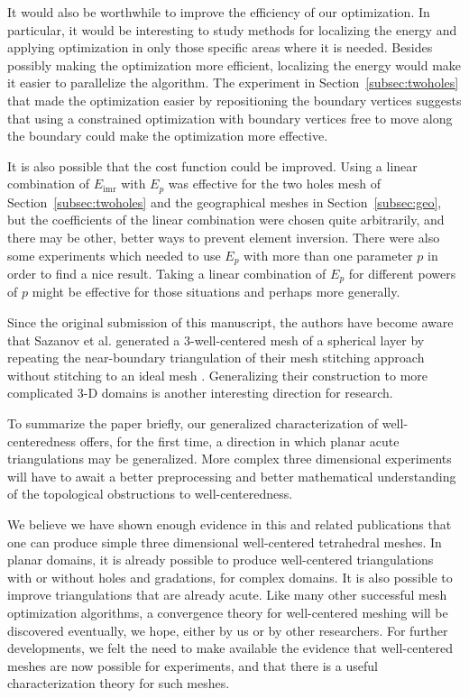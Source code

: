 \documentclass[final]{siamltex}
\begin{document}
It would also be worthwhile to improve the efficiency of
our optimization.  In particular, it would be interesting
to study methods for localizing the energy and applying
optimization in only those specific areas where
it is needed. Besides possibly making the optimization
more efficient, localizing the energy would make it
easier to parallelize the algorithm.  The experiment
in Section~\ref{subsec:twoholes} that made the optimization easier
by repositioning the boundary vertices suggests that
using a constrained optimization with boundary
vertices free to move along the boundary could make the
optimization more effective.

It is also possible that the cost function could be improved.  Using a
linear combination of $E_{\text{imr}}$ with $E_{p}$ was effective for
the two holes mesh of Section~\ref{subsec:twoholes} and
the geographical meshes in Section~\ref{subsec:geo},
but the coefficients of the linear combination
were chosen quite arbitrarily, and there may be other, better ways to
prevent element inversion.  There were also some experiments which
needed to use $E_{p}$ with more than one parameter $p$ in order to
find a nice result.  Taking a linear combination of $E_{p}$ for
different powers of $p$ might be effective for those situations and
perhaps more generally.


Since the original submission of this
manuscript, the authors have become aware
that Sazanov et al. generated a $3$-well-centered mesh
of a spherical layer by repeating the near-boundary triangulation
of their mesh stitching approach without stitching to an ideal
mesh \cite{SaHaMoWe2007}.  Generalizing their construction
to more complicated 3-D domains is another interesting direction
for research.

To summarize the paper briefly,
our generalized characterization of well-cen\-tered\-ness
offers, for the first time, a direction in which planar acute
triangulations may be generalized. More complex three dimensional
experiments will have to await a better preprocessing and better
mathematical understanding of the topological obstructions to
well-centeredness.

We believe we have shown enough evidence in this and related
publications that one can produce simple three dimensional
well-centered tetrahedral meshes. In planar domains, it is already
possible to produce well-centered triangulations with or without holes
and gradations, for complex domains. It is
also possible to improve triangulations
that are already acute. Like many other
successful mesh optimization algorithms, a convergence theory for
well-centered meshing will be discovered eventually, we hope, either
by us or by other researchers. For further developments, we felt the
need to make available the evidence that well-centered meshes are now
possible for experiments, and that there is a useful characterization
theory for such meshes.
\end{document}
